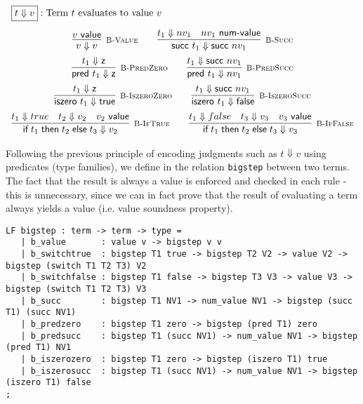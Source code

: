 \[
\begin{array}{c}
\multicolumn{1}{l}{\fbox{$t \Downarrow v$}: \mbox{Term $t$ evaluates to value $v$}}\\[1em]
  \infer[\BValue]{v \Downarrow v}{v \Value} \qquad
  \infer[\BSucc]{\tmsucc t_1 \Downarrow \tmsucc nv_1}{t_1 \Downarrow nv_1 & nv_1 \NumValue} \\[0.5em]
  \infer[\BPredZero]{\tmpred t_1 \Downarrow \tmzero}{t_1 \Downarrow \tmzero} \qquad
  \infer[\BPredSucc]{\tmpred t_1 \Downarrow nv_1}{t_1 \Downarrow \tmsucc nv_1}
\\[0.5em]
  \infer[\BIszeroZero]{\tmiszero t_1 \Downarrow \tmtrue}{t_1 \Downarrow \tmzero} \qquad
  \infer[\BIszeroSucc]{\tmiszero t_1 \Downarrow \tmfalse}{t_1 \Downarrow \tmsucc nv_1} 
\\[0.5em]
  \infer[\BIfTrue]{\tmif {t_1}{t_2}{t_3} \Downarrow v_2}{t_1 \Downarrow true & t_2 \Downarrow v_2 & v_2 \Value} \qquad
  \infer[\BIfFalse]{\tmif {t_1}{t_2}{t_3} \Downarrow v_3}{t_1 \Downarrow false & t_3 \Downarrow v_3 & v_3 \Value} \\

\end{array}
\]

Following the previous principle of encoding judgments such as $t \Downarrow v$
using predicates (type families), we define in \beluga the relation
\lstinline!bigstep! between two terms. The fact that the result is always a
value is enforced and checked in each rule - this is unnecessary, since we can
in fact prove that the result of evaluating a term always yields a value
(i.e. value soundness property).

\begin{lstlisting}
LF bigstep : term -> term -> type =
   | b_value       : value v -> bigstep v v
   | b_switchtrue  : bigstep T1 true -> bigstep T2 V2 -> value V2 -> bigstep (switch T1 T2 T3) V2
   | b_switchfalse : bigstep T1 false -> bigstep T3 V3 -> value V3 -> bigstep (switch T1 T2 T3) V3
   | b_succ        : bigstep T1 NV1 -> num_value NV1 -> bigstep (succ T1) (succ NV1)
   | b_predzero    : bigstep T1 zero -> bigstep (pred T1) zero
   | b_predsucc    : bigstep T1 (succ NV1) -> num_value NV1 -> bigstep (pred T1) NV1
   | b_iszerozero  : bigstep T1 zero -> bigstep (iszero T1) true
   | b_iszerosucc  : bigstep T1 (succ NV1) -> num_value NV1 -> bigstep (iszero T1) false
;
\end{lstlisting}

